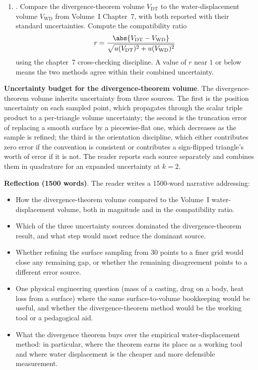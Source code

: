 \begin{project}
\begin{enumerate}[leftmargin=*]
  \item {}. Compare the
    divergence-theorem volume $V_{\text{DT}}$ to the
    water-displacement volume $V_{\text{WD}}$ from Volume~I
    Chapter~7, with both reported with their standard uncertainties.
    Compute the compatibility ratio
    \[
    r = \frac{\abs{V_{\text{DT}} - V_{\text{WD}}}}
             {\sqrt{u(V_{\text{DT}})^{2} + u(V_{\text{WD}})^{2}}}
    \]
    using the chapter~7 cross-checking discipline. A value of $r$
    near $1$ or below means the two methods agree within their
    combined uncertainty.
\end{enumerate}

\textbf{Uncertainty budget for the divergence-theorem volume}. The
divergence-theorem volume inherits uncertainty from three sources.
The first is the position uncertainty on each sampled point, which
propagates through the scalar triple product to a per-triangle
volume uncertainty; the second is the truncation error of replacing
a smooth surface by a piecewise-flat one, which decreases as the
sample is refined; the third is the orientation discipline, which
either contributes zero error if the convention is consistent or
contributes a sign-flipped triangle's worth of error if it is not.
The reader reports each source separately and combines them in
quadrature for an expanded uncertainty at $k = 2$.

\textbf{Reflection (1500 words)}. The reader writes a 1500-word
narrative addressing:

\begin{itemize}[leftmargin=*]
  \item How the divergence-theorem volume compared to the
    Volume~I water-displacement volume, both in magnitude and in
    the compatibility ratio.
  \item Which of the three uncertainty sources dominated the
    divergence-theorem result, and what step would most reduce the
    dominant source.
  \item Whether refining the surface sampling from $30$ points
    to a finer grid would close any remaining gap, or whether the
    remaining disagreement points to a different error source.
  \item One physical engineering question (mass of a casting,
    drag on a body, heat loss from a surface) where the same
    surface-to-volume bookkeeping would be useful, and whether the
    divergence-theorem method would be the working tool or a
    pedagogical aid.
  \item What the divergence theorem buys over the empirical
    water-displacement method: in particular, where the theorem
    earns its place as a working tool and where water displacement
    is the cheaper and more defensible measurement.
\end{itemize}


\end{project}
